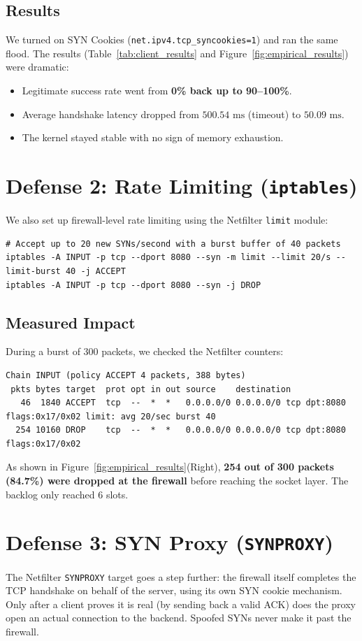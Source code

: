 \documentclass[11pt,a4paper]{report}
\begin{document}
\subsection{Results}
We turned on SYN Cookies (\texttt{net.ipv4.tcp\_syncookies=1}) and ran the same flood. The results (Table~\ref{tab:client_results} and Figure~\ref{fig:empirical_results}) were dramatic:
\begin{itemize}
    \item Legitimate success rate went from \textbf{0\% back up to 90--100\%}.
    \item Average handshake latency dropped from $500.54\text{ ms}$ (timeout) to $50.09\text{ ms}$.
    \item The kernel stayed stable with no sign of memory exhaustion.
\end{itemize}

\section{Defense 2: Rate Limiting (\texttt{iptables})}
We also set up firewall-level rate limiting using the Netfilter \texttt{limit} module:
\begin{lstlisting}[style=terminal]
# Accept up to 20 new SYNs/second with a burst buffer of 40 packets
iptables -A INPUT -p tcp --dport 8080 --syn -m limit --limit 20/s --limit-burst 40 -j ACCEPT
iptables -A INPUT -p tcp --dport 8080 --syn -j DROP
\end{lstlisting}

\subsection{Measured Impact}
During a burst of 300 packets, we checked the Netfilter counters:
\begin{lstlisting}[style=terminal]
Chain INPUT (policy ACCEPT 4 packets, 388 bytes)
 pkts bytes target  prot opt in out source    destination
   46  1840 ACCEPT  tcp  --  *  *   0.0.0.0/0 0.0.0.0/0 tcp dpt:8080 flags:0x17/0x02 limit: avg 20/sec burst 40
  254 10160 DROP    tcp  --  *  *   0.0.0.0/0 0.0.0.0/0 tcp dpt:8080 flags:0x17/0x02
\end{lstlisting}
As shown in Figure~\ref{fig:empirical_results}(Right), \textbf{254 out of 300 packets (84.7\%) were dropped at the firewall} before reaching the socket layer. The backlog only reached 6 slots.

\section{Defense 3: SYN Proxy (\texttt{SYNPROXY})}
The Netfilter \texttt{SYNPROXY} target goes a step further: the firewall itself completes the TCP handshake on behalf of the server, using its own SYN cookie mechanism. Only after a client proves it is real (by sending back a valid ACK) does the proxy open an actual connection to the backend. Spoofed SYNs never make it past the firewall.
\end{document}
